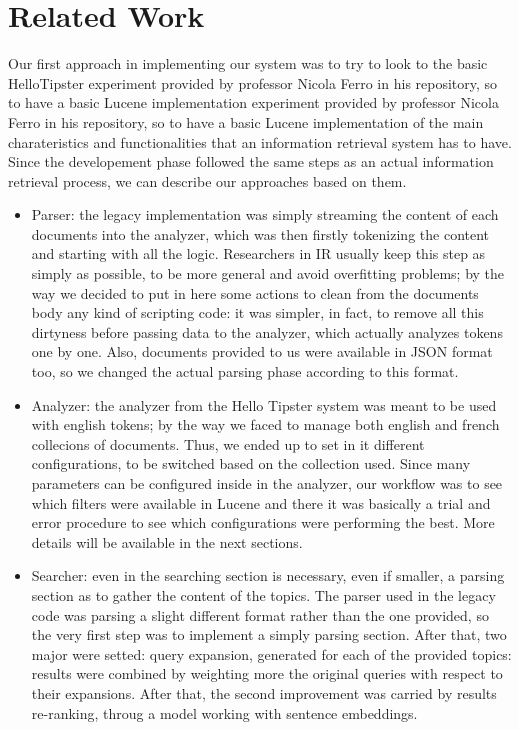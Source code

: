\section{Related Work}
\label{sec:related}

Our first approach in implementing our system was to try to look to the basic HelloTipster 
experiment provided by professor Nicola Ferro in his repository, so to have a basic Lucene implementation
experiment provided by professor Nicola Ferro in his repository, so to have a basic Lucene implementation
of the main charateristics and functionalities that an information retrieval system has to have.
Since the developement phase followed the same steps as an actual information retrieval process,
we can describe our approaches based on them.

\begin{itemize}
    \item Parser: the legacy implementation was simply streaming the content of each documents into the analyzer, which was then firstly tokenizing the content and starting with all the logic. Researchers in IR usually keep this step as simply as possible, to be more general and avoid overfitting problems; by the way we decided to put in here some actions to clean from the documents body any kind of scripting code: it was simpler, in fact, to remove all this dirtyness before passing data to the analyzer, which actually analyzes tokens one by one. Also, documents provided to us were available in JSON format too, so we changed the actual parsing phase according to this format.
    \item Analyzer: the analyzer from the Hello Tipster system was meant to be used with english tokens; by the way we faced to manage both english and french collecions of documents. Thus, we ended up to set in it different configurations, to be switched based on the collection used. Since many parameters can be configured inside in the analyzer, our workflow was to see which filters were available in Lucene and there it was basically a trial and error procedure to see which configurations were performing the best. More details will be available in the next sections.
    \item Searcher: even in the searching section is necessary, even if smaller, a parsing section as to gather the content of the topics. The parser used in the legacy code was parsing a slight different format rather than the one provided, so the very first step was to implement a simply parsing section. After that, two major were setted: query expansion, generated for each of the provided topics: results were combined by weighting more the original queries with respect to their expansions. After that, the second improvement was carried by results re-ranking, throug a model working with sentence embeddings.
\end{itemize}

\pagebreak